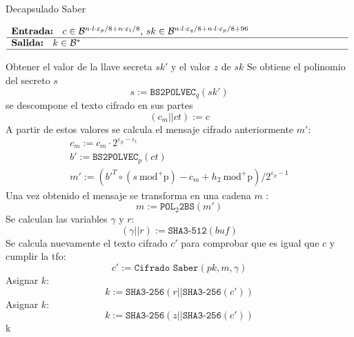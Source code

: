 \begin{algorithm}[H]
	\small
	\caption{Decapsulado Saber}
	$\begin{array}{p{\textwidth}}
		\textbf{Entrada: } \(c\in \mathcal{B}^{n\cdot l\cdot \varepsilon_p/8+n\cdot \varepsilon_t/8}\), \(sk\in \mathcal{B}^{n\cdot l \cdot \varepsilon_q/8+n\cdot l \cdot \varepsilon_p/8+96}\)\\ 
		\hline
		\textbf{Salida: } \(k\in \mathcal{B}^{*}\)\\ 
		\hline
	\end{array}$
	\begin{algorithmic}[1]
		\State Obtener el valor de la llave secreta \(sk'\) y el valor \(z\) de \(sk\) 
		\State Se obtiene el polinomio del secreto \(s\)
		\begin{equation}
			s:=\texttt{BS2POLVEC}_q(sk')
		\end{equation}
		\State se descompone el texto cifrado en sus partes
		\begin{equation}
			(c_m||ct):=c
		\end{equation}
		\State A partir de estos valores se calcula el mensaje cifrado anteriormente \(m'\):
		\begin{equation}
			\begin{array}{l}
				c_m:=c_m\cdot 2^{\varepsilon_p-\varepsilon_t}\\
				b':=\texttt{BS2POLVEC}_p(ct)\\
				m':=(b'^T \circ (s \ \text{mod}^{+}\text{p}) -c_m +h_2 \ \text{mod}^{+}\text{p})/2^{\varepsilon_p-1}
			\end{array}
		\end{equation}
		\State Una vez obtenido el mensaje se transforma en una cadena \(m\) :
		\begin{equation}
			m:=\texttt{POL}_2\texttt{2BS}(m')
		\end{equation}
		\State Se calculan las variables \(\gamma\) y \(r\):
		\begin{equation}
			(\gamma||r):=\texttt{SHA3-512}(buf)
		\end{equation}
		\State Se calcula nuevamente el texto cifrado \(c'\) para comprobar que es igual que \(c\) y cumplir la \acrshort{tfo}:
		\begin{equation}
			c':=\texttt{Cifrado Saber}(pk,m,\gamma)
		\end{equation}
		\State Asignar \(k\):
		\begin{equation}
			k:=\texttt{SHA3-256}(r||\texttt{SHA3-256}(c'))
		\end{equation}
		\Else
		\State Asignar \(k\):
		\begin{equation}
			k:=\texttt{SHA3-256}(z||\texttt{SHA3-256}(c'))
		\end{equation}
		\EndIf
		\State \Return k
	\end{algorithmic}
\end{algorithm}
\newpage
